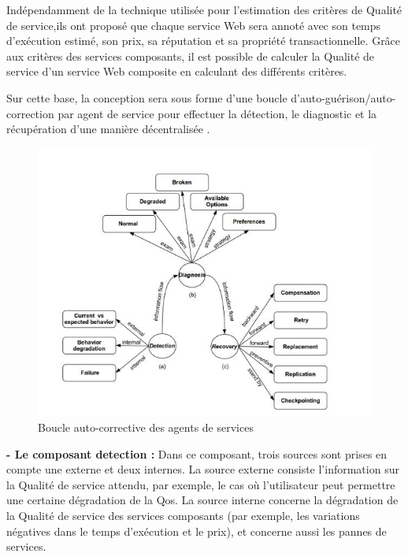 Indépendamment de la technique utilisée pour l'estimation des critères de Qualité de service,ils ont proposé que chaque service Web sera annoté avec son temps d'exécution estimé, son prix, sa réputation et sa propriété transactionnelle. Grâce aux critères des services composants, il est possible de calculer la Qualité de service d'un service Web composite en calculant des différents critères.

Sur cette base, la conception sera sous forme d'une boucle d'auto-guérison/auto-correction par agent de service pour effectuer la détection, le diagnostic et la récupération d'une manière décentralisée \cite{1}.


\begin{figure}[H]
\begin{center}
\includegraphics[width=1\linewidth]{images/Boucleauto-correctivedesAgentsdeService.jpg}
\end{center}
\caption{Boucle auto-corrective des agents de services\cite{1}}
\label{fig:5}
\end{figure}

\textbf{- Le composant detection :} Dans ce composant, trois sources sont prises en compte une externe et deux internes. 
La source externe consiste l'information sur la Qualité de service attendu, par exemple, le cas où l'utilisateur peut permettre une certaine dégradation de la Qos.
La source interne concerne la dégradation de la Qualité de service des services composants (par exemple, les variations négatives dans le temps d'exécution et le prix), et concerne aussi les pannes de services.

